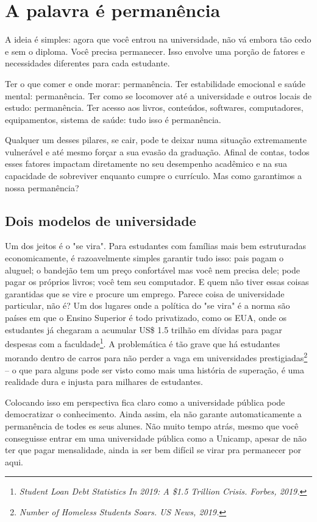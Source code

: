 \section{A palavra é permanência}

A ideia é simples: agora que você entrou na universidade, não vá embora tão cedo e
sem o diploma. Você precisa permanecer. Isso envolve uma porção de fatores e
necessidades diferentes para cada estudante.

Ter o que comer e onde morar: permanência. Ter estabilidade emocional e saúde
mental: permanência. Ter como se locomover até a universidade e outros locais de
estudo: permanência. Ter acesso aos livros, conteúdos, softwares, computadores,
equipamentos, sistema de saúde: tudo isso é permanência.

Qualquer um desses pilares, se cair, pode te deixar numa situação extremamente
vulnerável e até mesmo forçar a sua evasão da graduação. Afinal de contas, todos esses
fatores impactam diretamente no seu desempenho acadêmico e na sua capacidade de
sobreviver enquanto cumpre o currículo. Mas como garantimos a nossa permanência?

\subsection{Dois modelos de universidade}

Um dos jeitos é o "se vira". Para estudantes com famílias mais bem estruturadas
economicamente, é razoavelmente simples garantir tudo isso: pais pagam o aluguel; o
bandejão tem um preço confortável mas você nem precisa dele; pode pagar os próprios
livros; você tem seu computador. E quem não tiver essas coisas garantidas que se vire e
procure um emprego. Parece coisa de universidade particular, não é? Um dos lugares
onde a política do "se vira" é a norma são países em que o Ensino Superior é todo
privatizado, como os EUA, onde os estudantes já chegaram a acumular US\$ 1.5 trilhão
em dívidas para pagar despesas com a faculdade\footnote{\textit{Student Loan Debt Statistics In 2019: A \$1.5 Trillion Crisis. Forbes, 2019.}}. A problemática é tão grave que há
estudantes morando dentro de carros para não perder a vaga em universidades
prestigiadas\footnote{\textit{Number of Homeless Students Soars. US News, 2019.}} – o que para alguns pode ser visto como mais uma história de
superação, é uma realidade dura e injusta para milhares de estudantes.

Colocando isso em perspectiva fica claro como a universidade pública pode
democratizar o conhecimento. Ainda assim, ela não garante automaticamente a
permanência de todes es seus alunes. Não muito tempo atrás, mesmo que você
conseguisse entrar em uma universidade pública como a Unicamp, apesar de não ter
que pagar mensalidade, ainda ia ser bem difícil se virar pra permanecer por aqui.

